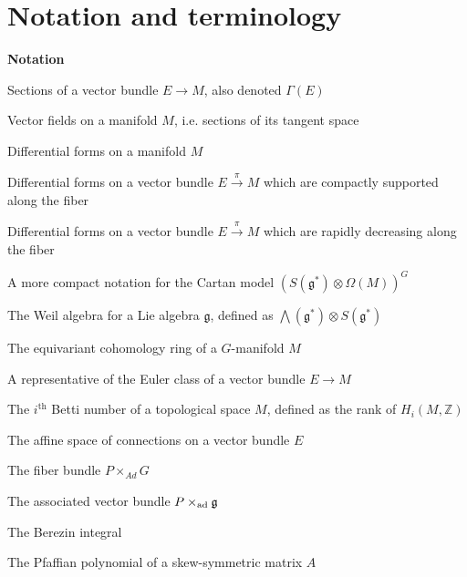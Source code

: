 

\chapter{Notation and terminology}\label{notation}

\renewcommand{\thefootnote}{\fnsymbol{footnote}}


\noindent\textbf{Notation}


\newcommand{\nttn}[2]{\item[{\ \parbox{3.18cm}{#1}}]{#2}}
\begin{list}{}{ \setlength{\leftmargin}{3.4cm}
                \setlength{\labelwidth}{3.4cm}}

\nttn{$\Gamma(M,E)$}{Sections of a vector bundle $E\to M$, also denoted $\Gamma(E)$}

\nttn{$\mathcal{X}(M)$}{Vector fields on a manifold $M$, i.e. sections of its
tangent space}

\nttn{$\Omega(M)$}{Differential forms on a manifold $M$}

\nttn{$\Omega_{cv}(E)$}{Differential forms on a vector bundle
	$E\xrightarrow{\pi} M$ which are compactly supported along the fiber}

\nttn{$\Omega_{rd}(E)$}{Differential forms on a vector bundle
	$E\xrightarrow{\pi} M$ which are rapidly decreasing along the fiber}

\nttn{$\Omega_G(M)$}{A more compact notation for the Cartan model
$(S(\mathfrak{g}^*)\otimes \Omega(M))^G$}

\nttn{$W(\mathfrak{g})$}{The Weil algebra for a Lie algebra $\mathfrak{g}$,
defined as $\bigwedge (\mathfrak{g}^*) \otimes S(\mathfrak{g}^*)$}

\nttn{$H_G(M)$}{The equivariant cohomology ring of a $G$-manifold  $M$}

\nttn{$\chi(E\to M)$ \\or $\chi(E)$}{A representative of the Euler class of a vector bundle
$E\to M$}


\nttn{$b_i$}{The $i^{\text{th}}$ Betti number of a topological space $M$, defined as
the rank of $H_i(M,\mathbb{Z})$}

\nttn{$\mathcal{A}(E)$}{The affine space of connections on a vector bundle $E$}

\nttn{$\Ad P$}{The fiber bundle $P\times_{Ad} G$}

\nttn{$\ad(P)$}{The associated vector bundle $P\times_{\operatorname{ad}}\operatorname{\mathfrak{g}}$}

\nttn{$\int^B$}{The Berezin integral}


\nttn{$\Pf(A)$}{The Pfaffian polynomial of a skew-symmetric matrix $A$}

\end{list}

